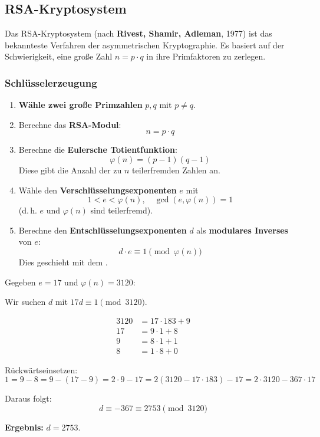 \documentclass[
../../css_summary.tex,
]
{subfiles}
\begin{document}
\subsection{RSA-Kryptosystem}

\begin{defbox}[Idee]
   Das RSA-Kryptosystem (nach \textbf{Rivest, Shamir, Adleman}, 1977) ist das bekannteste Verfahren der asymmetrischen Kryptographie.
   Es basiert auf der Schwierigkeit, eine große Zahl $n = p \cdot q$ in ihre Primfaktoren zu zerlegen.
\end{defbox}

\subsubsection{Schlüsselerzeugung}

\begin{enumerate}
   \item \textbf{Wähle zwei große Primzahlen} $p, q$ mit $p \neq q$.
   \item Berechne das \textbf{RSA-Modul}:
         \[
            n = p \cdot q
         \]
   \item Berechne die \textbf{Eulersche Totientfunktion}:
         \[
            \varphi(n) = (p-1)(q-1)
         \]
         Diese gibt die Anzahl der zu $n$ teilerfremden Zahlen an.
   \item Wähle den \textbf{Verschlüsselungsexponenten} $e$ mit
         \[
            1 < e < \varphi(n), \quad \gcd(e, \varphi(n)) = 1
         \]
         (d.\,h. $e$ und $\varphi(n)$ sind teilerfremd).
   \item Berechne den \textbf{Entschlüsselungsexponenten} $d$ als \textbf{modulares Inverses} von $e$:
         \[
            d \cdot e \equiv 1 \pmod{\varphi(n)}
         \]
         Dies geschieht mit dem .
\end{enumerate}

\begin{defbox}
   Gegeben $e = 17$ und $\varphi(n) = 3120$:

   Wir suchen $d$ mit $17d \equiv 1 \pmod{3120}$.

   \begin{align*}
      3120 & = 17 \cdot 183 + 9 \\
      17   & = 9 \cdot 1 + 8    \\
      9    & = 8 \cdot 1 + 1    \\
      8    & = 1 \cdot 8 + 0
   \end{align*}

   Rückwärtseinsetzen:
   \[
      1 = 9 - 8 = 9 - (17 - 9) = 2 \cdot 9 - 17 = 2(3120 - 17 \cdot 183) - 17 = 2\cdot3120 - 367 \cdot 17
   \]

   Daraus folgt:
   \[
      d \equiv -367 \equiv 2753 \pmod{3120}
   \]

   \textbf{Ergebnis:} $d = 2753$.
\end{defbox}
\end{document}
